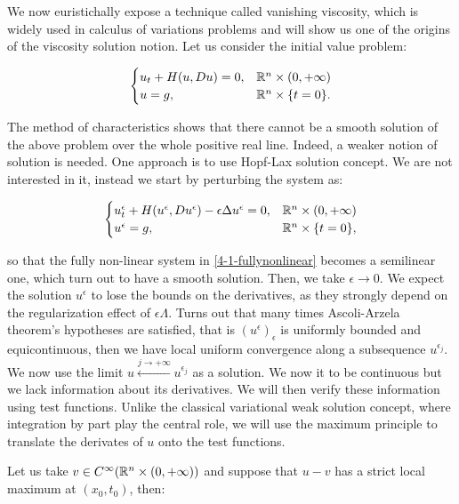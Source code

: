 We now euristichally expose a technique called vanishing viscosity, which is widely used in 
calculus of variations problems and will show us one of the origins of the viscosity 
solution notion. Let us consider the initial value problem:

\begin{equation}\label{4-1-fullynonlinear}
    \begin{cases}
        u_t + H(u,Du) = 0,& \mathbb{R}^n\times(0,+\infty) \\
        u = g,& \mathbb{R}^n\times\{t=0\}.
    \end{cases}
\end{equation}

The method of characteristics shows that there cannot be a smooth solution of the above problem over the whole positive 
real line. Indeed, a weaker notion of solution is needed. One approach is to use Hopf-Lax solution concept. We are not 
interested in it, instead we start by perturbing the system as:

\begin{equation}
    \begin{cases}
        u^{\epsilon}_t + H(u^{\epsilon},Du^{\epsilon}) -\epsilon\Delta u^{\epsilon}= 0,& \mathbb{R}^n\times(0,+\infty) \\
        u^{\epsilon} = g,& \mathbb{R}^n\times\{t=0\},
    \end{cases}
\end{equation}

so that the fully non-linear system in \ref{4-1-fullynonlinear} becomes a semilinear one, which turn out to have a smooth solution. 
Then, we take $\epsilon\to0$. We expect the solution $u^{\epsilon}$ to lose the bounds on the derivatives, as they strongly depend on the 
regularization effect of $\epsilon\Lambda$. Turns out that many times Ascoli-Arzela theorem's hypotheses are satisfied, that is $(u^{\epsilon})_{\epsilon}$ 
is uniformly bounded and equicontinuous, then we have local uniform convergence along a subsequence $u^{\epsilon_j}$. We now use the limit
$u\xleftarrow{j\to+\infty}u^{\epsilon_j}$ as a solution. 
We now it to be continuous but we lack information about its derivatives. We will then verify these information using test functions. 
Unlike the classical variational weak solution concept, where integration by part play the central role, we will use the maximum principle 
to translate the derivates of $u$ onto the test functions. 

Let us take $v\in C^{\infty}(\mathbb{R}^n\times(0,+\infty))$ and suppose that $u-v$ has a strict local maximum at $(x_0,t_0)$, then:

